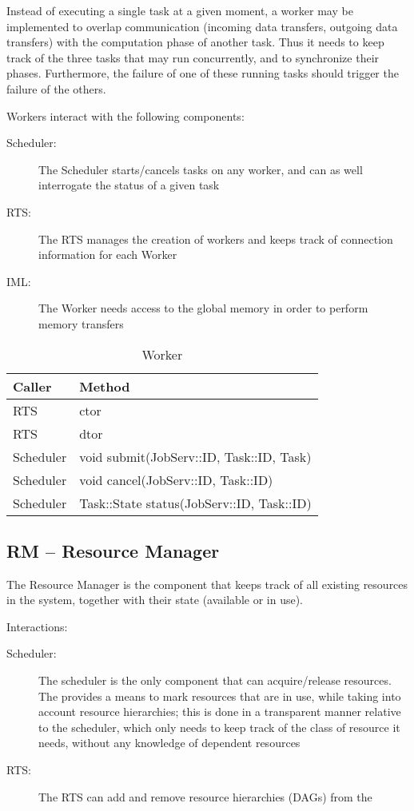 \documentclass[10pt]{article}
\newcommand{\rts}{RTS\xspace}
\newcommand{\sched}{Scheduler\xspace}
\newcommand{\worker}{Worker\xspace}
\newcommand{\workers}{Workers\xspace}
\newcommand{\iml}{IML\xspace}
\newcommand{\js}{JobServ\xspace}
\newcommand{\task}{Task\xspace}
\newcommand{\id}{::ID\xspace}
\begin{document}
Instead of executing a single task at a given moment, a worker may be
implemented to overlap communication (incoming data transfers, outgoing data
transfers) with the computation phase of another task.
Thus it needs to keep track of the three tasks that may run concurrently, and to
synchronize their phases.
Furthermore, the failure of one of these running tasks should  trigger the
failure of the others.

\workers interact with the following components:
\begin{description}
    \item [\sched:] The \sched starts/cancels tasks on any worker, and can as
    well interrogate the status of a given task
    \item [\rts:] The \rts manages the creation of workers and keeps track of
    connection information for each \worker
    \item [\iml:] The \worker needs access to the global memory in order to
    perform memory transfers
\end{description}

%
\begin{table}[ht]
    \centering
    \caption{Worker}
    \label{tab:worker}
    \bgroup
    \setlength{\tabcolsep}{2em}
    \begin{tabular}{ll}
        \toprule
        Caller & Method \\
        \midrule
        \rts & ctor \\
        \rts & dtor \\
        \sched & void submit(\js\id, \task\id, \task)  \\
        \sched & void cancel(\js\id, \task\id) \\
        \sched & \task::State status(\js\id, \task\id) \\
        \bottomrule
    \end{tabular}
    \egroup
\end{table}
%


\subsection{RM -- Resource Manager}

The Resource Manager is the component that keeps track of all existing resources in the system, together with their state (available or in use). 

Interactions:
\begin{description}
    \item [\sched:] The scheduler is the only component that can acquire/release resources. The \rm provides a means to mark resources that are in use, while taking into account resource hierarchies; this is done in a transparent manner relative to the scheduler, which only needs to keep track of the class of resource it needs, without any knowledge of dependent resources
    \item [\rts:] The \rts can add and remove resource hierarchies (DAGs) from the \rm
\end{description}
\end{document}

